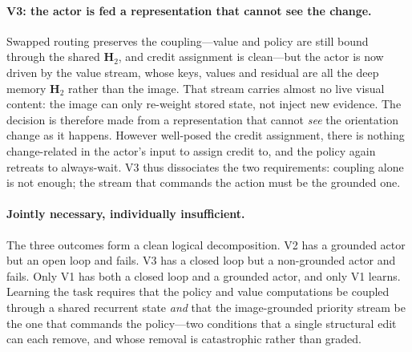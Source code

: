 \paragraph{V3: the actor is fed a representation that cannot see the change.} Swapped routing preserves the coupling---value and policy are still bound through the shared $\mathbf{H}_2$, and credit assignment is clean---but the actor is now driven by the value stream, whose keys, values and residual are all the deep memory $\mathbf{H}_2$ rather than the image. That stream carries almost no live visual content: the image can only re-weight stored state, not inject new evidence. The decision is therefore made from a representation that cannot \emph{see} the orientation change as it happens. However well-posed the credit assignment, there is nothing change-related in the actor's input to assign credit to, and the policy again retreats to always-wait. V3 thus dissociates the two requirements: coupling alone is not enough; the stream that commands the action must be the grounded one.

\paragraph{Jointly necessary, individually insufficient.} The three outcomes form a clean logical decomposition. V2 has a grounded actor but an open loop and fails. V3 has a closed loop but a non-grounded actor and fails. Only V1 has both a closed loop and a grounded actor, and only V1 learns. Learning the task requires that the policy and value computations be coupled through a shared recurrent state \emph{and} that the image-grounded priority stream be the one that commands the policy---two conditions that a single structural edit can each remove, and whose removal is catastrophic rather than graded.
